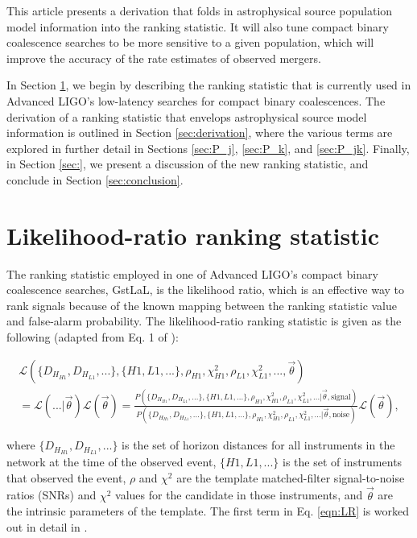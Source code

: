\documentclass[twocolumn,showpacs,unsortedaddress,superscriptaddress,showkeys,nofootinbib,preprintnumbers,letterpaper]{revtex4-1}
\begin{document}
This article presents a derivation that folds in astrophysical source population model information into the ranking statistic. It will also tune compact binary coalescence searches to be more sensitive to a given population, which will improve the accuracy of the rate estimates of observed mergers. 

In Section \ref{sec:rankingstat}, we begin by describing the ranking statistic that is currently used in Advanced LIGO's low-latency searches for compact binary coalescences. The derivation of a ranking statistic that envelops astrophysical source model information is outlined in Section \ref{sec:derivation}, where the various terms are explored in further detail in Sections \ref{sec:P_j}, \ref{sec:P_k}, and \ref{sec:P_jk}. Finally, in Section \ref{sec:}, we present a discussion of the new ranking statistic, and conclude in Section \ref{sec:conclusion}.


\section{Likelihood-ratio ranking statistic} \label{sec:rankingstat}

The ranking statistic employed in one of Advanced LIGO's compact binary coalescence searches, GstLaL, is the likelihood ratio, which is an effective way to rank signals because of the known mapping between the ranking statistic value and false-alarm probability. The likelihood-ratio ranking statistic is given as the following (adapted from Eq. 1 of \cite{2015arXiv150404632C}):
	\begin{widetext}
	\begin{multline}
	\label{eqn:LR}
	\mathcal{L}(\{D_{H_{H1}}, D_{H_{L1}}, ...\}, \{H1, L1, ...\}, \rho_{H1}, \chi^2_{H1}, \rho_{L1}, \chi^2_{L1}, ..., \vec{\theta}) \\
	= \mathcal{L}(...| \vec{\theta}) \mathcal{L}(\vec{\theta}) = \frac{P(\{D_{H_{H1}}, D_{H_{L1}}, ...\}, \{H1, L1, ...\}, \rho_{H1}, \chi^2_{H1}, \rho_{L1}, \chi^2_{L1}, ... | \vec{\theta}, \text{signal})}{P(\{D_{H_{H1}}, D_{H_{L1}}, ...\}, \{H1, L1, ...\}, \rho_{H1}, \chi^2_{H1}, \rho_{L1}, \chi^2_{L1}, ... | \vec{\theta}, \text{noise})} \mathcal{L}(\vec{\theta}), 
	\end{multline}
	\end{widetext}
where $\{D_{H_{H1}}, D_{H_{L1}}, ...\}$ is the set of horizon distances for all instruments in the network at the time of the observed event, $\{H1, L1, ...\}$ is the set of instruments that observed the event, $\rho$ and $\chi^2$ are the template matched-filter signal-to-noise ratios (SNRs) and $\chi^2$ values for the candidate in those instruments, and $\vec{\theta}$ are the intrinsic parameters of the template. The first term in Eq. \ref{eqn:LR} is worked out in detail in \cite{2015arXiv150404632C}.
\end{document}

